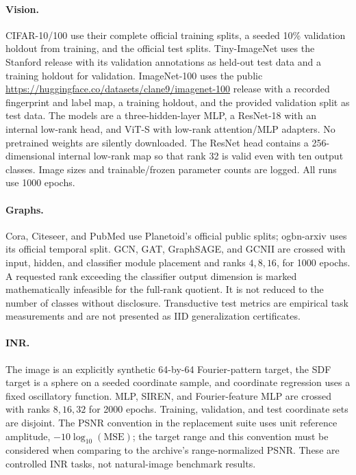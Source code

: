 \paragraph{Vision.} CIFAR-10/100 use their complete official training splits, a seeded 10\% validation holdout from training, and the official test splits. Tiny-ImageNet uses the Stanford release with its validation annotations as held-out test data and a training holdout for validation. ImageNet-100 uses the public \url{https://huggingface.co/datasets/clane9/imagenet-100} release with a recorded fingerprint and label map, a training holdout, and the provided validation split as test data. The models are a three-hidden-layer MLP, a ResNet-18 with an internal low-rank head, and ViT-S with low-rank attention/MLP adapters. No pretrained weights are silently downloaded. The ResNet head contains a 256-dimensional internal low-rank map so that rank 32 is valid even with ten output classes. Image sizes and trainable/frozen parameter counts are logged. All runs use 1000 epochs.

\paragraph{Graphs.} Cora, Citeseer, and PubMed use Planetoid's official public splits; ogbn-arxiv uses its official temporal split. GCN, GAT, GraphSAGE, and GCNII are crossed with input, hidden, and classifier module placement and ranks $4,8,16$, for 1000 epochs. A requested rank exceeding the classifier output dimension is marked mathematically infeasible for the full-rank quotient. It is not reduced to the number of classes without disclosure. Transductive test metrics are empirical task measurements and are not presented as IID generalization certificates.

\paragraph{INR.} The image is an explicitly synthetic 64-by-64 Fourier-pattern target, the SDF target is a sphere on a seeded coordinate sample, and coordinate regression uses a fixed oscillatory function. MLP, SIREN, and Fourier-feature MLP are crossed with ranks $8,16,32$ for 2000 epochs. Training, validation, and test coordinate sets are disjoint. The PSNR convention in the replacement suite uses unit reference amplitude, $-10\log_{10}(\mathrm{MSE})$; the target range and this convention must be considered when comparing to the archive's range-normalized PSNR. These are controlled INR tasks, not natural-image benchmark results.

